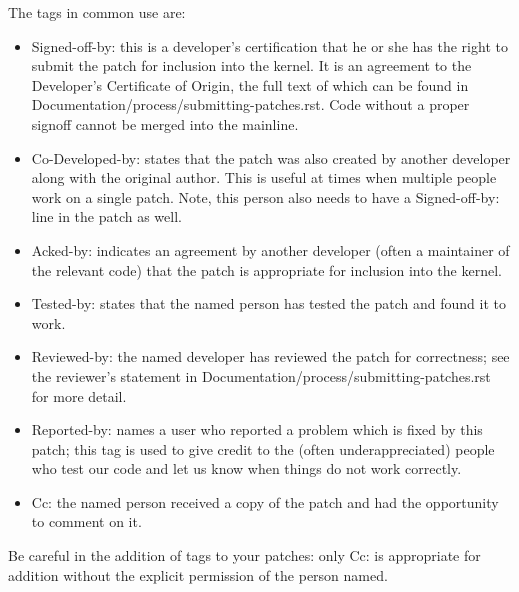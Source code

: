 \documentclass[a4paper,8pt,english]{sphinxmanual}
\begin{document}
The tags in common use are:
\begin{itemize}
\item {} 
Signed-off-by: this is a developer's certification that he or she has
the right to submit the patch for inclusion into the kernel.  It is an
agreement to the Developer's Certificate of Origin, the full text of
which can be found in Documentation/process/submitting-patches.rst.  Code without a
proper signoff cannot be merged into the mainline.

\item {} 
Co-Developed-by: states that the patch was also created by another developer
along with the original author.  This is useful at times when multiple
people work on a single patch.  Note, this person also needs to have a
Signed-off-by: line in the patch as well.

\item {} 
Acked-by: indicates an agreement by another developer (often a
maintainer of the relevant code) that the patch is appropriate for
inclusion into the kernel.

\item {} 
Tested-by: states that the named person has tested the patch and found
it to work.

\item {} 
Reviewed-by: the named developer has reviewed the patch for correctness;
see the reviewer's statement in Documentation/process/submitting-patches.rst for more
detail.

\item {} 
Reported-by: names a user who reported a problem which is fixed by this
patch; this tag is used to give credit to the (often underappreciated)
people who test our code and let us know when things do not work
correctly.

\item {} 
Cc: the named person received a copy of the patch and had the
opportunity to comment on it.

\end{itemize}

Be careful in the addition of tags to your patches: only Cc: is appropriate
for addition without the explicit permission of the person named.
\end{document}
